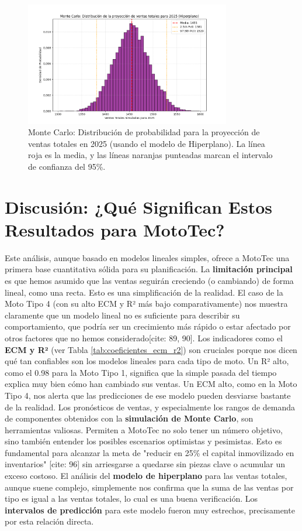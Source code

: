 \documentclass[12pt,a4paper]{article}
\begin{document}
\begin{figure}[H]
\centering
\includegraphics[width=0.8\textwidth]{Monte carlo Distribucion de la proyeccion de ventas totales para 2025.png}
\caption{Monte Carlo: Distribución de probabilidad para la proyección de ventas totales en 2025 (usando el modelo de Hiperplano). La línea roja es la media, y las líneas naranjas punteadas marcan el intervalo de confianza del 95\%.}
\label{fig:mc_total_sales_2025_img}
\end{figure}

\section{Discusión: ¿Qué Significan Estos Resultados para MotoTec?}
Este análisis, aunque basado en modelos lineales simples, ofrece a MotoTec una primera base cuantitativa sólida para su planificación.
La \textbf{limitación principal} es que hemos asumido que las ventas seguirán creciendo (o cambiando) de forma lineal, como una recta. Esto es una simplificación de la realidad. El caso de la Moto Tipo 4 (con su alto ECM y R² más bajo comparativamente) nos muestra claramente que un modelo lineal no es suficiente para describir su comportamiento, que podría ser un crecimiento más rápido o estar afectado por otros factores que no hemos considerado[cite: 89, 90].
Los indicadores como el \textbf{ECM y R²} (ver Tabla \ref{tab:coeficientes_ecm_r2}) son cruciales porque nos dicen qué tan confiables son los modelos lineales para cada tipo de moto. Un R² alto, como el 0.98 para la Moto Tipo 1, significa que la simple pasada del tiempo explica muy bien cómo han cambiado sus ventas. Un ECM alto, como en la Moto Tipo 4, nos alerta que las predicciones de ese modelo pueden desviarse bastante de la realidad.
Los pronósticos de ventas, y especialmente los rangos de demanda de componentes obtenidos con la \textbf{simulación de Monte Carlo}, son herramientas valiosas. Permiten a MotoTec no solo tener un número objetivo, sino también entender los posibles escenarios optimistas y pesimistas. Esto es fundamental para alcanzar la meta de "reducir en 25\% el capital inmovilizado en inventarios" [cite: 96] sin arriesgarse a quedarse sin piezas clave o acumular un exceso costoso.
El análisis del \textbf{modelo de hiperplano} para las ventas totales, aunque suene complejo, simplemente nos confirma que la suma de las ventas por tipo es igual a las ventas totales, lo cual es una buena verificación. Los \textbf{intervalos de predicción} para este modelo fueron muy estrechos, precisamente por esta relación directa.
\end{document}
